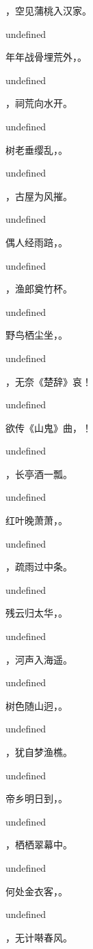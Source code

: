 \documentclass[12pt, a4paper, addpoints]{exam}
\begin{document}
\begin{questions}
\question[3] \fillin，空见蒲桃入汉家。

undefined

\question[3] 年年战骨埋荒外，\fillin。

undefined

\question[3] \fillin，祠荒向水开。

undefined

\question[3] 树老垂缨乱，\fillin。

undefined

\question[3] \fillin，古屋为风摧。

undefined

\question[3] 偶人经雨踣，\fillin。

undefined

\question[3] \fillin，渔郎奠竹杯。

undefined

\question[3] 野鸟栖尘坐，\fillin。

undefined

\question[3] \fillin，无奈《楚辞》哀！

undefined

\question[3] 欲传《山鬼》曲，\fillin！

undefined

\question[3] \fillin，长亭酒一瓢。

undefined

\question[3] 红叶晚萧萧，\fillin。

undefined

\question[3] \fillin，疏雨过中条。

undefined

\question[3] 残云归太华，\fillin。

undefined

\question[3] \fillin，河声入海遥。

undefined

\question[3] 树色随山迥，\fillin。

undefined

\question[3] \fillin，犹自梦渔樵。

undefined

\question[3] 帝乡明日到，\fillin。

undefined

\question[3] \fillin，栖栖翠幕中。

undefined

\question[3] 何处金衣客，\fillin。

undefined

\question[3] \fillin，无计啭春风。


\end{questions}
\end{document}
